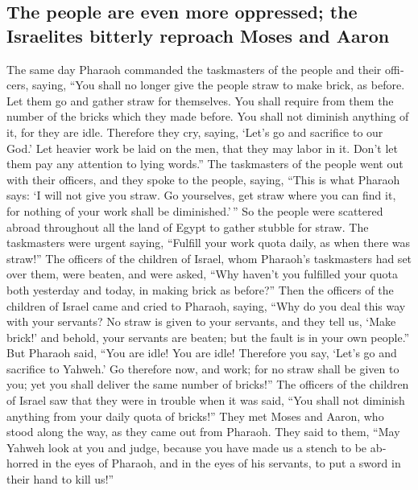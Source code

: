 \begin{paracol}{2}
\begin{otherlanguage}{english}
\hypertarget{the-people-are-even-more-oppressed-the-israelites-bitterly-reproach-moses-and-aaron}{%
\subsection{The people are even more oppressed; the Israelites bitterly
reproach Moses and
Aaron}\label{the-people-are-even-more-oppressed-the-israelites-bitterly-reproach-moses-and-aaron}}

 The same day Pharaoh commanded the taskmasters of the
people and their officers, saying,  ``You shall no longer
give the people straw to make brick, as before. Let them go and gather
straw for themselves.  You shall require from them the
number of the bricks which they made before. You shall not diminish
anything of it, for they are idle. Therefore they cry, saying, `Let's go
and sacrifice to our God.'  Let heavier work be laid on
the men, that they may labor in it. Don't let them pay any attention to
lying words.''  The taskmasters of the people went out
with their officers, and they spoke to the people, saying, ``This is
what Pharaoh says: `I will not give you straw.  Go
yourselves, get straw where you can find it, for nothing of your work
shall be diminished.'\,''  So the people were scattered
abroad throughout all the land of Egypt to gather stubble for straw.
 The taskmasters were urgent saying, ``Fulfill your work
quota daily, as when there was straw!''  The officers of
the children of Israel, whom Pharaoh's taskmasters had set over them,
were beaten, and were asked, ``Why haven't you fulfilled your quota both
yesterday and today, in making brick as before?''  Then
the officers of the children of Israel came and cried to Pharaoh,
saying, ``Why do you deal this way with your servants? 
No straw is given to your servants, and they tell us, `Make brick!' and
behold, your servants are beaten; but the fault is in your own people.''
 But Pharaoh said, ``You are idle! You are idle!
Therefore you say, `Let's go and sacrifice to Yahweh.' 
Go therefore now, and work; for no straw shall be given to you; yet you
shall deliver the same number of bricks!''  The officers
of the children of Israel saw that they were in trouble when it was
said, ``You shall not diminish anything from your daily quota of
bricks!''  They met Moses and Aaron, who stood along the
way, as they came out from Pharaoh.  They said to them,
``May Yahweh look at you and judge, because you have made us a stench to
be abhorred in the eyes of Pharaoh, and in the eyes of his servants, to
put a sword in their hand to kill us!''


\end{otherlanguage}
\end{paracol}
